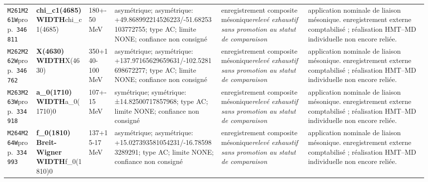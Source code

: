 \begin{landscape}
\begin{longtable}{L{1.85cm}L{4.45cm}L{2.35cm}L{4.05cm}L{3.35cm}L{7.15cm}}
\texttt{M261}\newline \texttt{M261W}\newline prop.\ \texttt{346811} & \textbf{chi\_\allowbreak{}c1(4685) WIDTH}\newline chi\_\allowbreak{}c1(4685) & 180+-50\,MeV & asymétrique; asymétrique: +49.868992214526223/-51.68253103772755; type AC; limite NONE; confiance non consigné & enregistrement composite mésonique\newline \emph{relevé exhaustif sans promotion au statut de comparaison} & application nominale de liaison mésonique. enregistrement externe comptabilisé ; réalisation HMT--MD individuelle non encore reliée. \\
\texttt{M262}\newline \texttt{M262W}\newline prop.\ \texttt{346762} & \textbf{X(4630) WIDTH}\newline X(4630) & 350+140-100\,MeV & asymétrique; asymétrique: +137.97165629659631/-102.5281698672277; type AC; limite NONE; confiance non consigné & enregistrement composite mésonique\newline \emph{relevé exhaustif sans promotion au statut de comparaison} & application nominale de liaison mésonique. enregistrement externe comptabilisé ; réalisation HMT--MD individuelle non encore reliée. \\
\texttt{M263}\newline \texttt{M263W}\newline prop.\ \texttt{334918} & \textbf{a\_\allowbreak{}0(1710) WIDTH}\newline a\_\allowbreak{}0(1710)0 & 107+-15\,MeV & symétrique; symétrique: ±14.82500717857968; type AC; limite NONE; confiance non consigné & enregistrement composite mésonique\newline \emph{relevé exhaustif sans promotion au statut de comparaison} & application nominale de liaison mésonique. enregistrement externe comptabilisé ; réalisation HMT--MD individuelle non encore reliée. \\
\texttt{M264}\newline \texttt{M264W}\newline prop.\ \texttt{334993} & \textbf{f\_\allowbreak{}0(1810) Breit-Wigner WIDTH}\newline f\_\allowbreak{}0(1810)0 & 137+15-17\,MeV & asymétrique; asymétrique: +15.027393581054231/-16.785983289291; type AC; limite NONE; confiance non consigné & enregistrement composite mésonique\newline \emph{relevé exhaustif sans promotion au statut de comparaison} & application nominale de liaison mésonique. enregistrement externe comptabilisé ; réalisation HMT--MD individuelle non encore reliée. \\

\end{longtable}
\end{landscape}
